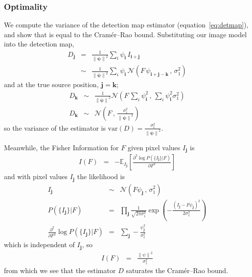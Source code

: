 \documentclass[letterpaper,preprint]{aastex62}
\newcommand{\equationname}{equation}
\newcommand{\eqnref}[1]{\mbox{\equationname~\ref{#1}}}
\newcommand{\var}[1]{\mathrm{Var}({#1})}
\newcommand{\drawnfrom}{\sim}
\newcommand{\gaussianN}{\mathcal{N}}
\newcommand{\gaussx}[2]{\gaussianN\!\left(#1 \, , \, #2\right)}
\newcommand{\psf}{\psi}
\newcommand{\psfat}[1]{\psf_{#1}}
\newcommand{\psfnorm}{\norm{\bm{\psf}}}
\newcommand{\norm}[1]{\left\lVert #1 \right\rVert}
\renewcommand{\var}[1]{\mathrm{var}\left( #1 \right)}
\renewcommand{\vec}[1]{\boldsymbol{#1}}
\newcommand{\ivec}{\vec{i}}
\newcommand{\jvec}{\vec{j}}
\newcommand{\kvec}{\vec{k}}
\begin{document}
\subsubsection{Optimality}

We compute the variance of the detection map estimator
(\eqnref{eq:detmap}), and show that is equal to the Cram\'er--Rao
bound.  Substituting our image model into the detection map,
\begin{eqnarray}
D_{\jvec} &=& \frac{1}{\psfnorm^2} \sum_{i} \psfat{\ivec} \,
I_{\ivec + \jvec}
\\
& \drawnfrom & \frac{1}{\psfnorm^2} \sum_{i} \psfat{\ivec} \,
\gaussx{F \, \psfat{\ivec + \jvec - \kvec}}{\sigma_1^2}
\end{eqnarray}
and at the true source position, $\jvec = \kvec$;
\begin{eqnarray}
%
D_{\kvec} &\drawnfrom& \frac{1}{\psfnorm^2} \gaussx%
{F \, \sum_{i} \psfat{\ivec}^2}%
{\sum_{i} \psfat{\ivec}^2 \sigma_1^2}
\\
D_{\kvec} &\drawnfrom& \gaussx%
{F}{\frac{\sigma_1^2}{\psfnorm^2}}
\end{eqnarray}
so the variance of the estimator is $\var{D} = \frac{\sigma_1^2}{\psfnorm^2}$.

Meanwhile, the Fisher Information for $F$ given pixel values $I_{\jvec}$ is
\begin{eqnarray}
  I(F) &=& -\mathbb{E}_{I_{\jvec}} \left[ \frac{\partial^2 \log P(\{ I_{\jvec} \} | F)}{\partial F^2} \right]
\end{eqnarray}
and with pixel values $I_{\jvec}$ the likelihood is
\begin{eqnarray}
  I_{\jvec} &\drawnfrom& \gaussx{F \psf_{\jvec}}{\sigma_1^2} \\
  P(\{ I_{\jvec} \} | F) &=& \prod_{\jvec} \frac{1}{\sqrt{2 \pi \sigma_1^2}} \exp \left( -\frac{(I_{\jvec} - F \psf_{\jvec})^2}{2 \sigma_1^2} \right) \\
  \frac{\partial^2}{\partial F^2} \log P(\{ I_{\jvec} \} | F) &=& \sum_{\jvec} -\frac{\psf_{\jvec}^2}{\sigma_1^2}
\end{eqnarray}
which is independent of $I_{\jvec}$, so
\begin{eqnarray}
  I(F) &=& \frac{\norm{\psf}^2}{\sigma_1^2}
\end{eqnarray}
from which we see that the estimator $D$ saturates the Cram\'er--Rao bound.
\end{document}
